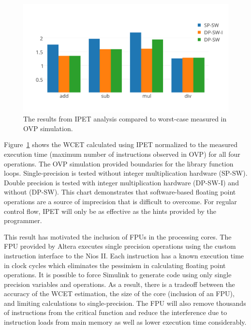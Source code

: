\documentclass[table,11pt]{article}
\begin{document}
\begin{figure}[h]
\centering
\includegraphics[scale=0.5]{figures/ipetresults}
\caption{The results from IPET analysis compared to worst-case measured in OVP simulation.}
\label{f:ipetresults}
\end{figure}


Figure~\ref{f:ipetresults} shows the WCET calculated using IPET normalized to the measured execution time (maximum number of instructions observed in OVP) for all four operations. The OVP simulation provided boundaries for the library function loops. Single-precision is tested without integer multiplication hardware (SP-SW). Double precision is tested with integer multiplication hardware (DP-SW-I) and without (DP-SW). This chart demonstrates that software-based floating point operations are a source of imprecision that is difficult to overcome. 
For regular control flow, IPET will only be as effective as the hints provided by the programmer.

This result has motivated the inclusion of FPUs in the processing cores. The FPU provided by Altera executes single precision operations using the custom instruction interface to the Nios II. Each instruction has a known execution time in clock cycles which eliminates the pessimism in calculating floating point operations. It is possible to force Simulink to generate code using only single precision variables and operations. As a result, there is a tradeoff between the accuracy of the WCET estimation, the size of the core (inclusion of an FPU), and limiting calculations to single-precision. The FPU will also remove thousands of instructions from the critical function and reduce the interference due to instruction loads from main memory as well as lower execution time considerably.


   
 
\end{document}
